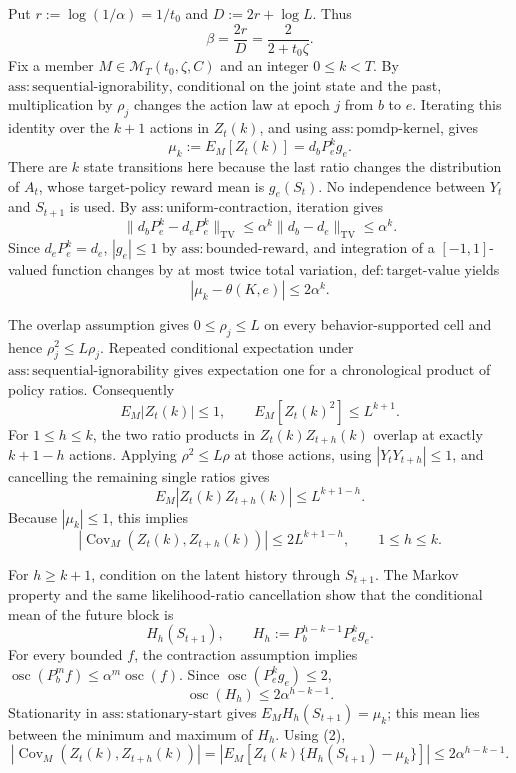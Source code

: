 Put \(r:=\log(1/\alpha)=1/t_0\) and \(D:=2r+\log L\).  Thus
\[
 \beta=\frac{2r}{D}=\frac{2}{2+t_0\zeta}.
\]
Fix a member \(M\in\mathcal M_T(t_0,\zeta,C)\) and an integer \(0\le k<T\).  By \(\mathrm{ass{:}sequential\text{-}ignorability}\), conditional on the joint state and the past, multiplication by \(\rho_j\) changes the action law at epoch \(j\) from \(b\) to \(e\).  Iterating this identity over the \(k+1\) actions in \(Z_t(k)\), and using \(\mathrm{ass{:}pomdp\text{-}kernel}\), gives
\[
 \mu_k:=E_M[Z_t(k)]=d_bP_e^kg_e .
\]
There are \(k\) state transitions here because the last ratio changes the distribution of \(A_t\), whose target-policy reward mean is \(g_e(S_t)\).  No independence between \(Y_t\) and \(S_{t+1}\) is used.  By \(\mathrm{ass{:}uniform\text{-}contraction}\), iteration gives
\[
 \|d_bP_e^k-d_eP_e^k\|_{\mathrm{TV}}
 \le \alpha^k\|d_b-d_e\|_{\mathrm{TV}}\le \alpha^k.
\]
Since \(d_eP_e^k=d_e\), \(|g_e|\le1\) by \(\mathrm{ass{:}bounded\text{-}reward}\), and integration of a \([-1,1]\)-valued function changes by at most twice total variation, \(\mathrm{def{:}target\text{-}value}\) yields
\[
 |\mu_k-\theta(K,e)|\le2\alpha^k. \tag{1}
\]

The overlap assumption gives \(0\le\rho_j\le L\) on every behavior-supported cell and hence \(\rho_j^2\le L\rho_j\).  Repeated conditional expectation under \(\mathrm{ass{:}sequential\text{-}ignorability}\) gives expectation one for a chronological product of policy ratios.  Consequently
\[
 E_M|Z_t(k)|\le1,
 \qquad E_M[Z_t(k)^2]\le L^{k+1}. \tag{2}
\]
For \(1\le h\le k\), the two ratio products in \(Z_t(k)Z_{t+h}(k)\) overlap at exactly \(k+1-h\) actions.  Applying \(\rho^2\le L\rho\) at those actions, using \(|Y_tY_{t+h}|\le1\), and cancelling the remaining single ratios gives
\[
 E_M|Z_t(k)Z_{t+h}(k)|\le L^{k+1-h}.
\]
Because \(|\mu_k|\le1\), this implies
\[
 |\operatorname{Cov}_M(Z_t(k),Z_{t+h}(k))|
 \le2L^{k+1-h},\qquad 1\le h\le k. \tag{3}
\]

For \(h\ge k+1\), condition on the latent history through \(S_{t+1}\).  The Markov property and the same likelihood-ratio cancellation show that the conditional mean of the future block is
\[
 H_h(S_{t+1}),\qquad
 H_h:=P_b^{h-k-1}P_e^kg_e.
\]
For every bounded \(f\), the contraction assumption implies
\(\operatorname{osc}(P_b^mf)\le\alpha^m\operatorname{osc}(f)\).  Since \(\operatorname{osc}(P_e^kg_e)\le2\),
\[
 \operatorname{osc}(H_h)\le2\alpha^{h-k-1}.
\]
Stationarity in \(\mathrm{ass{:}stationary\text{-}start}\) gives \(E_MH_h(S_{t+1})=\mu_k\); this mean lies between the minimum and maximum of \(H_h\).  Using (2),
\[
 |\operatorname{Cov}_M(Z_t(k),Z_{t+h}(k))|
 =|E_M[Z_t(k)\{H_h(S_{t+1})-\mu_k\}]|
 \le2\alpha^{h-k-1}. \tag{4}
\]

